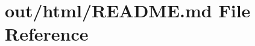 \hypertarget{out_2html_2README_8md}{\section{out/html/\-R\-E\-A\-D\-M\-E.md File Reference}
\label{out_2html_2README_8md}
}

